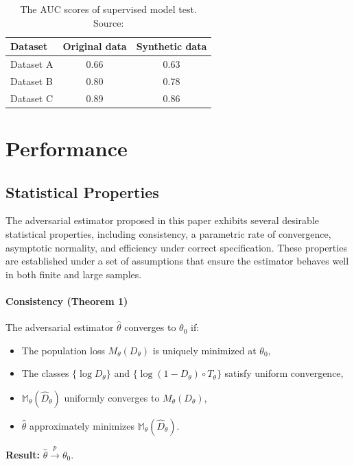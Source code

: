 \documentclass[12pt]{article}
\begin{document}
\begin{table}[h!]
    \centering
    \begin{tabular}{lcc}
        \hline Dataset   & Original data & Synthetic data \\
        \hline Dataset A & 0.66          & 0.63           \\
        Dataset B        & 0.80          & 0.78           \\
        Dataset C        & 0.89          & 0.86           \\
        \hline
    \end{tabular}
    \caption{The AUC scores of supervised model test. Source: \cite{efimovUsingGenerativeAdversarial2020}}
    \label{tab:auc_scores}
\end{table}

\section{Performance}\label{sec:performance}

\subsection{Statistical Properties} \label{subsec:statistical_properties}

The adversarial estimator proposed in this paper exhibits several desirable
statistical properties, including consistency, a parametric rate of
convergence, asymptotic normality, and efficiency under correct specification.
These properties are established under a set of assumptions that ensure the
estimator behaves well in both finite and large samples.

\paragraph{Consistency (Theorem 1)} The adversarial estimator \(\hat{\theta}\) converges to \(\theta_0\) if:
\begin{itemize}
    \item The population loss \(M_\theta(D_\theta)\) is uniquely minimized at
          \(\theta_0\),
    \item The classes \(\{\log D_\theta\}\) and \(\{\log(1 - D_\theta) \circ T_\theta\}\)
          satisfy uniform convergence,
    \item \(\mathbb{M}_\theta(\hat{D}_\theta)\) uniformly converges to \(M_\theta(D_\theta)\),
    \item \(\hat{\theta}\) approximately minimizes \(\mathbb{M}_\theta(\hat{D}_\theta)\).
\end{itemize}
\textbf{Result:} \(\hat{\theta} \xrightarrow{p} \theta_0\).
\end{document}
